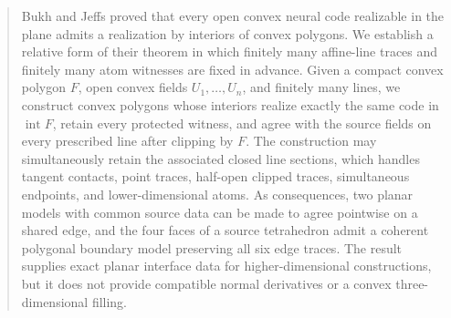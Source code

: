 \begin{abstract}
Bukh and Jeffs proved that every open convex neural code realizable in the
plane admits a realization by interiors of convex polygons.  We establish a
relative form of their theorem in which finitely many affine-line traces and
finitely many atom witnesses are fixed in advance.  Given a compact convex
polygon $F$, open convex fields $U_1,\ldots,U_n$, and finitely many lines, we
construct convex polygons whose interiors realize exactly the same code in
$\operatorname{int}F$, retain every protected witness, and agree with the
source fields on every prescribed line after clipping by $F$.  The
construction may simultaneously retain the associated closed line sections,
which handles tangent contacts, point traces, half-open clipped traces,
simultaneous endpoints, and lower-dimensional atoms.  As consequences, two
planar models with common source data can be made to agree pointwise on a
shared edge, and the four faces of a source tetrahedron admit a coherent
polygonal boundary model preserving all six edge traces.  The result supplies
exact planar interface data for higher-dimensional constructions, but it
does not provide compatible normal derivatives or a convex
three-dimensional filling.
\end{abstract}
